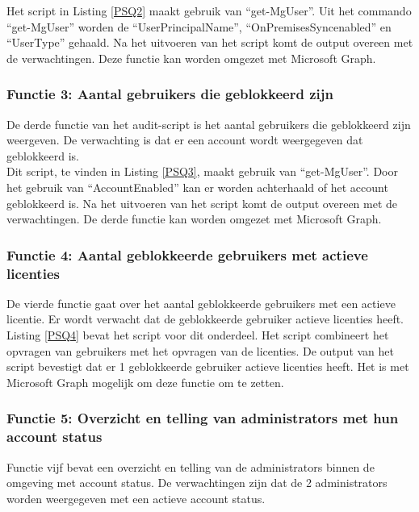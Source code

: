 Het script in Listing \ref{PSQ2} maakt gebruik van “get-MgUser”. Uit het commando “get-MgUser” worden de “UserPrincipalName”, “OnPremisesSyncenabled” en “UserType” gehaald.  Na het uitvoeren van het script komt de output overeen met de verwachtingen. Deze functie kan worden omgezet met Microsoft Graph. \\

\subsubsection{Functie 3: Aantal gebruikers die geblokkeerd zijn}

De derde functie van het audit-script is het aantal gebruikers die geblokkeerd zijn weergeven. De verwachting is dat er een account wordt weergegeven dat geblokkeerd is. \\

Dit script, te vinden in Listing \ref{PSQ3}, maakt gebruik van “get-MgUser”. Door het gebruik van “AccountEnabled” kan er worden achterhaald of het account geblokkeerd is. Na het uitvoeren van het script komt de output overeen met de verwachtingen. De derde functie kan worden omgezet met Microsoft Graph. 

\subsubsection{Functie 4: Aantal geblokkeerde gebruikers met actieve licenties}

De vierde functie gaat over het aantal geblokkeerde gebruikers met een actieve licentie. Er wordt verwacht dat de geblokkeerde gebruiker actieve licenties heeft. \\

Listing \ref{PSQ4} bevat het script voor dit onderdeel. Het script combineert het opvragen van gebruikers met het opvragen van de licenties. De output van het script bevestigt dat er 1 geblokkeerde gebruiker actieve licenties heeft. Het is met Microsoft Graph mogelijk om deze functie om te zetten.

\subsubsection{Functie 5: Overzicht en telling van administrators met hun account status}

Functie vijf bevat een overzicht en telling van de administrators binnen de omgeving met account status. De verwachtingen zijn dat de 2 administrators worden weergegeven met een actieve account status. \\

